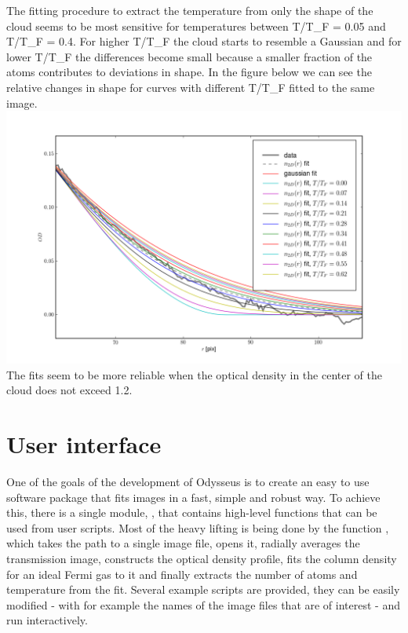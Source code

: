 \documentclass[letterpaper,10pt,english]{manual}
\begin{document}
The fitting procedure to extract the temperature from only the shape of the cloud seems to be most sensitive for temperatures between T/T\_F = 0.05 and T/T\_F = 0.4. For higher T/T\_F the cloud starts to resemble a Gaussian and for lower T/T\_F the differences become small because a smaller fraction of the atoms contributes to deviations in shape. In the figure below we can see the relative changes in shape for curves with different T/T\_F fitted to the same image.
\includegraphics[width=500pt]{fit_several_temperatures.png}
The fits seem to be more reliable when the optical density in the center of the cloud does not exceed 1.2.

\resetcurrentobjects


\section{User interface}

One of the goals of the development of Odysseus is to create an easy to use software package that fits images in a fast, simple and robust way. To achieve this, there is a single module, \hyperlink{module-fitfermions}{}, that contains high-level functions that can be used from user scripts. Most of the heavy lifting is being done by the function \hyperlink{fitfermions.fit_img}{}, which takes the path to a single image file, opens it, radially averages the transmission image, constructs the optical density profile, fits the column density for an ideal Fermi gas to it and finally extracts the number of atoms and temperature from the fit. Several example scripts are provided, they can be easily modified - with for example the names of the image files that are of interest - and run interactively.
\end{document}
